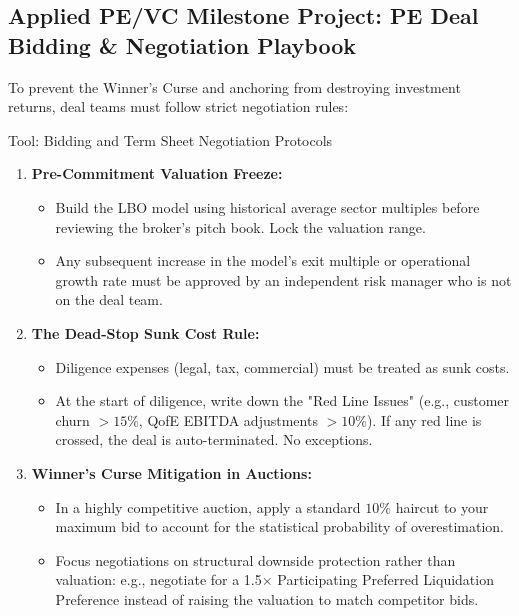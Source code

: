 \documentclass[11pt,a4paper]{article}
\begin{document}
\newpage
\subsection{Applied PE/VC Milestone Project: PE Deal Bidding \& Negotiation Playbook}
To prevent the Winner's Curse and anchoring from destroying investment returns, deal teams must follow strict negotiation rules:

\begin{pevcbox}{Tool: Bidding and Term Sheet Negotiation Protocols}
\begin{enumerate}
    \item \textbf{Pre-Commitment Valuation Freeze:}
    \begin{itemize}
        \item Build the LBO model using historical average sector multiples before reviewing the broker's pitch book. Lock the valuation range.
        \item Any subsequent increase in the model's exit multiple or operational growth rate must be approved by an independent risk manager who is not on the deal team.
    \end{itemize}
    \item \textbf{The Dead-Stop Sunk Cost Rule:}
    \begin{itemize}
        \item Diligence expenses (legal, tax, commercial) must be treated as sunk costs. 
        \item At the start of diligence, write down the "Red Line Issues" (e.g., customer churn $>15\%$, QofE EBITDA adjustments $>10\%$). If any red line is crossed, the deal is auto-terminated. No exceptions.
    \end{itemize}
    \item \textbf{Winner's Curse Mitigation in Auctions:}
    \begin{itemize}
        \item In a highly competitive auction, apply a standard $10\%$ haircut to your maximum bid to account for the statistical probability of overestimation.
        \item Focus negotiations on structural downside protection rather than valuation: e.g., negotiate for a 1.5$\times$ Participating Preferred Liquidation Preference instead of raising the valuation to match competitor bids.
    \end{itemize}
\end{enumerate}
\end{pevcbox}
\end{document}
